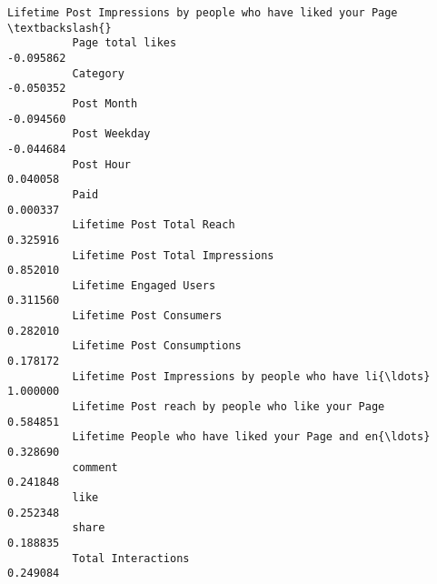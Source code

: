 \documentclass[11pt]{article}
\begin{document}
\begin{Verbatim}[commandchars=\\\{\}]
                                                              Lifetime Post Impressions by people who have liked your Page  \textbackslash{}
          Page total likes                                                                            -0.095862              
          Category                                                                                    -0.050352              
          Post Month                                                                                  -0.094560              
          Post Weekday                                                                                -0.044684              
          Post Hour                                                                                    0.040058              
          Paid                                                                                         0.000337              
          Lifetime Post Total Reach                                                                    0.325916              
          Lifetime Post Total Impressions                                                              0.852010              
          Lifetime Engaged Users                                                                       0.311560              
          Lifetime Post Consumers                                                                      0.282010              
          Lifetime Post Consumptions                                                                   0.178172              
          Lifetime Post Impressions by people who have li{\ldots}                                           1.000000              
          Lifetime Post reach by people who like your Page                                             0.584851              
          Lifetime People who have liked your Page and en{\ldots}                                           0.328690              
          comment                                                                                      0.241848              
          like                                                                                         0.252348              
          share                                                                                        0.188835              
          Total Interactions                                                                           0.249084              
          

\end{Verbatim}
\end{document}
